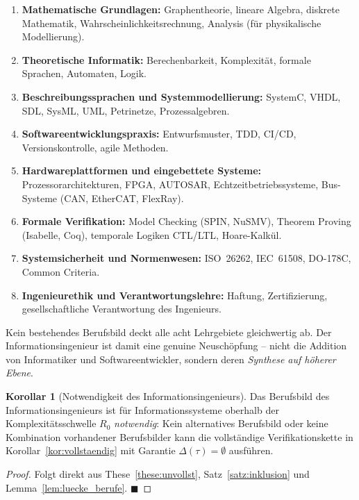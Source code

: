 ﻿\documentclass[a4paper,12pt]{article}
\theoremstyle{definition}
\newtheorem{korollar}{Korollar}
\begin{document}
\begin{enumerate}
  \item \textbf{Mathematische Grundlagen:}
        Graphentheorie, lineare Algebra, diskrete Mathematik, Wahrscheinlichkeitsrechnung,
        Analysis (für physikalische Modellierung).
  \item \textbf{Theoretische Informatik:}
        Berechenbarkeit, Komplexität, formale Sprachen, Automaten, Logik.
  \item \textbf{Beschreibungssprachen und Systemmodellierung:}
        SystemC, VHDL, SDL, SysML, UML, Petrinetze, Prozessalgebren.
  \item \textbf{Softwareentwicklungspraxis:}
        Entwurfsmuster, TDD, CI/CD, Versionskontrolle, agile Methoden.
  \item \textbf{Hardwareplattformen und eingebettete Systeme:}
        Prozessorarchitekturen, FPGA, AUTOSAR, Echtzeitbetriebssysteme,
        Bus-Systeme (CAN, EtherCAT, FlexRay).
  \item \textbf{Formale Verifikation:}
        Model Checking (SPIN, NuSMV), Theorem Proving (Isabelle, Coq),
        temporale Logiken CTL/LTL, Hoare-Kalkül.
  \item \textbf{Systemsicherheit und Normenwesen:}
        ISO~26262, IEC~61508, DO-178C, Common Criteria.
  \item \textbf{Ingenieurethik und Verantwortungslehre:}
        Haftung, Zertifizierung, gesellschaftliche Verantwortung des Ingenieurs.
\end{enumerate}

Kein bestehendes Berufsbild deckt alle acht Lehrgebiete gleichwertig ab.
Der Informationsingenieur ist damit eine genuine Neuschöpfung -- nicht die Addition
von Informatiker und Softwareentwickler, sondern deren \emph{Synthese auf
höherer Ebene}.

\begin{korollar}[Notwendigkeit des Informationsingenieurs]
\label{kor:notwendigkeit}
Das Berufsbild des Informationsingenieurs ist für Informationssysteme oberhalb der
Komplexitätsschwelle $R_0$ \emph{notwendig}: Kein alternatives Berufsbild oder keine
Kombination vorhandener Berufsbilder kann die vollständige Verifikationskette in
Korollar~\ref{kor:vollstaendig} mit Garantie $\Delta(\tau) = \emptyset$ ausführen.
\end{korollar}

\begin{proof}
Folgt direkt aus These~\ref{these:unvollst}, Satz~\ref{satz:inklusion}
und Lemma~\ref{lem:luecke_berufe}. $\blacksquare$
\end{proof}
\end{document}
